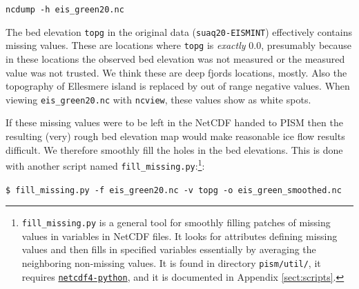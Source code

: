 \documentclass[11pt,final]{amsart}
\begin{document}
\verb|ncdump -h eis_green20.nc|

The bed elevation \verb|topg| in the original data (\verb|suaq20-EISMINT|) effectively contains missing values.  These are locations where \verb|topg| is \emph{exactly} $0.0$, presumably because in these locations the observed bed elevation was not measured or the measured value was not trusted.  We think these are deep fjords locations, mostly.  Also the topography of Ellesmere island is replaced by out of range negative values.  When viewing \verb|eis_green20.nc| with \verb|ncview|, these values show as white spots.  

If these missing values were to be left in the NetCDF handed to PISM then the resulting (very) rough bed elevation map would make reasonable ice flow results difficult.  We therefore smoothly fill the holes in the bed elevations.  This is done with another script named \verb|fill_missing.py|:\footnote{\texttt{fill\_missing.py} is a general tool for smoothly filling patches of missing values in variables in NetCDF files.  It looks for attributes defining missing values and then fills in specified variables essentially by averaging the neighboring non-missing values.  It is found in directory \texttt{pism/util/}, it requires \href{http://code.google.com/p/netcdf4-python/}{\texttt{netcdf4-python}}, and it is documented in Appendix \ref{sect:scripts}.}:

\verb|$ fill_missing.py -f eis_green20.nc -v topg -o eis_green_smoothed.nc|
\end{document}
